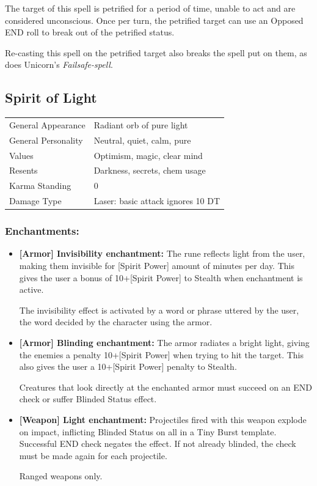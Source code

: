 \documentclass[11pt,a4paper,twocolumn]{book}
\begin{document}
The target of this spell is petrified for a period of time, unable to act and are considered unconscious. Once per turn, the petrified target can use an Opposed END roll to break out of the petrified status. 

Re-casting this spell on the petrified target also breaks the spell put on them, as does Unicorn's \textit{Failsafe-spell}.

\bigskip
\noindent

\subsection*{Spirit of Light}
{
	\begin{tabu} to 75mm{| X[l,4] | X[l,8] |}
		\hline
		General Appearance		& Radiant orb of pure light				\\
        General Personality	   	& Neutral, quiet, calm, pure			\\
        Values     				& Optimism, magic, clear mind			\\
        Resents     			& Darkness, secrets, chem usage 		\\
        Karma Standing      	& 0										\\
        Damage Type 			& Laser: basic attack ignores 10 DT	 	\\ \hline
	\end{tabu}
		
}

\medskip
\subsubsection*{Enchantments:}

\begin{itemize}
\item \textbf{ [Armor] Invisibility enchantment:} The rune reflects light from the user, making them invisible for [Spirit Power] amount of minutes per day. This gives the user a bonus of 10+[Spirit Power] to Stealth when enchantment is active.

The invisibility effect is activated by a word or phrase uttered by the user, the word decided by the character using the armor.

\item \textbf{ [Armor] Blinding enchantment:} The armor radiates a bright light, giving the enemies a penalty 10+[Spirit Power] when trying to hit the target. This also gives the user a 10+[Spirit Power] penalty to Stealth.

Creatures that look directly at the enchanted armor must succeed on an END check or suffer Blinded Status effect.

\item \textbf{ [Weapon] Light enchantment:} Projectiles fired with this weapon explode on impact, inflicting Blinded Status on all in a Tiny Burst template. Successful END check negates the effect. If not already blinded, the check must be made again for each projectile.

Ranged weapons only.
\end{itemize}
\end{document}
